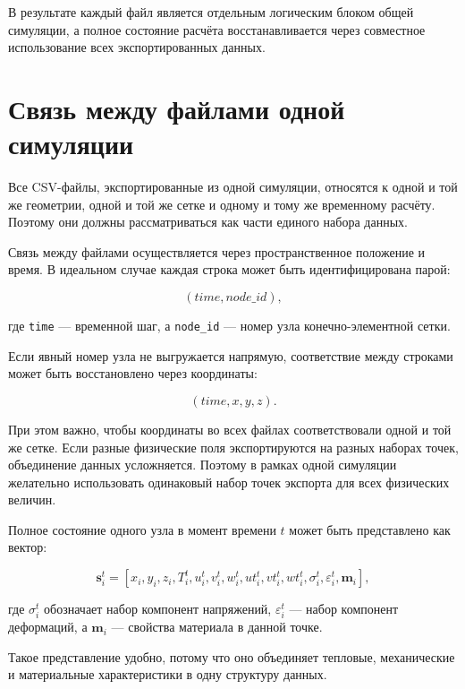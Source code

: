 В результате каждый файл является отдельным логическим блоком общей симуляции, а полное состояние расчёта восстанавливается через совместное использование всех экспортированных данных.

\section{Связь между файлами одной симуляции}

Все CSV-файлы, экспортированные из одной симуляции, относятся к одной и той же геометрии, одной и той же сетке и одному и тому же временному расчёту. Поэтому они должны рассматриваться как части единого набора данных.

Связь между файлами осуществляется через пространственное положение и время. В идеальном случае каждая строка может быть идентифицирована парой:

\begin{equation}
(time,node\_id),
\end{equation}

где \texttt{time} --- временной шаг, а \texttt{node\_id} --- номер узла конечно-элементной сетки.

Если явный номер узла не выгружается напрямую, соответствие между строками может быть восстановлено через координаты:

\begin{equation}
(time,x,y,z).
\end{equation}

При этом важно, чтобы координаты во всех файлах соответствовали одной и той же сетке. Если разные физические поля экспортируются на разных наборах точек, объединение данных усложняется. Поэтому в рамках одной симуляции желательно использовать одинаковый набор точек экспорта для всех физических величин.

Полное состояние одного узла в момент времени $t$ может быть представлено как вектор:

\begin{equation}
\mathbf{s}_i^t =
\left[
x_i,
y_i,
z_i,
T_i^t,
u_i^t,
v_i^t,
w_i^t,
ut_i^t,
vt_i^t,
wt_i^t,
\sigma_i^t,
\varepsilon_i^t,
\mathbf{m}_i
\right],
\end{equation}

где $\sigma_i^t$ обозначает набор компонент напряжений, $\varepsilon_i^t$ --- набор компонент деформаций, а $\mathbf{m}_i$ --- свойства материала в данной точке.

Такое представление удобно, потому что оно объединяет тепловые, механические и материальные характеристики в одну структуру данных.

